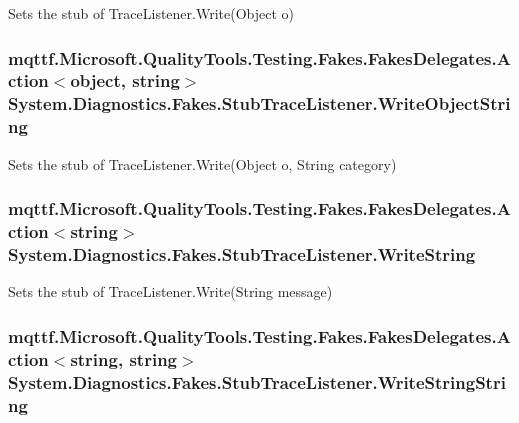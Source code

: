 Sets the stub of Trace\-Listener.\-Write(\-Object o)

\hypertarget{class_system_1_1_diagnostics_1_1_fakes_1_1_stub_trace_listener_a356829e8bc8d8ee940efcd856076ee77}{
\subsubsection[{Write\-Object\-String}]{\setlength{\rightskip}{0pt plus 5cm}mqttf.\-Microsoft.\-Quality\-Tools.\-Testing.\-Fakes.\-Fakes\-Delegates.\-Action$<$object, string$>$ System.\-Diagnostics.\-Fakes.\-Stub\-Trace\-Listener.\-Write\-Object\-String}}\label{class_system_1_1_diagnostics_1_1_fakes_1_1_stub_trace_listener_a356829e8bc8d8ee940efcd856076ee77}


Sets the stub of Trace\-Listener.\-Write(\-Object o, String category)

\hypertarget{class_system_1_1_diagnostics_1_1_fakes_1_1_stub_trace_listener_ab323e53e683804828e0b9470aa912434}{
\subsubsection[{Write\-String}]{\setlength{\rightskip}{0pt plus 5cm}mqttf.\-Microsoft.\-Quality\-Tools.\-Testing.\-Fakes.\-Fakes\-Delegates.\-Action$<$string$>$ System.\-Diagnostics.\-Fakes.\-Stub\-Trace\-Listener.\-Write\-String}}\label{class_system_1_1_diagnostics_1_1_fakes_1_1_stub_trace_listener_ab323e53e683804828e0b9470aa912434}


Sets the stub of Trace\-Listener.\-Write(\-String message)

\hypertarget{class_system_1_1_diagnostics_1_1_fakes_1_1_stub_trace_listener_a6c5536f834a7a07f1c626bc366e0c4e0}{
\subsubsection[{Write\-String\-String}]{\setlength{\rightskip}{0pt plus 5cm}mqttf.\-Microsoft.\-Quality\-Tools.\-Testing.\-Fakes.\-Fakes\-Delegates.\-Action$<$string, string$>$ System.\-Diagnostics.\-Fakes.\-Stub\-Trace\-Listener.\-Write\-String\-String}}\label{class_system_1_1_diagnostics_1_1_fakes_1_1_stub_trace_listener_a6c5536f834a7a07f1c626bc366e0c4e0}


